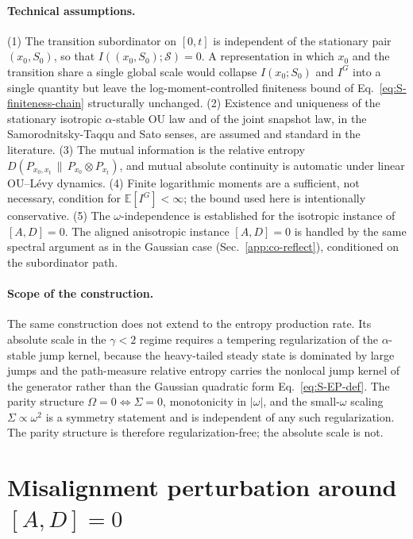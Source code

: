 \documentclass[%
 reprint,
 superscriptaddress,
 nofootinbib,
 nobibnotes,
 amsmath,amssymb,
 aps,
 prl,
 floatfix,
]{revtex4-2}
\newcommand{\E}{\mathbb{E}}
\begin{document}
\paragraph{Technical assumptions.}
(1) The transition subordinator on $[0, t]$ is independent of the stationary pair $(x_0, S_0)$, so that $I((x_0, S_0); \mathcal S) = 0$. A representation in which $x_0$ and the transition share a single global scale would collapse $I(x_0; S_0)$ and $I^G$ into a single quantity but leave the log-moment-controlled finiteness bound of Eq.~\eqref{eq:S-finiteness-chain} structurally unchanged. (2) Existence and uniqueness of the stationary isotropic $\alpha$-stable OU law and of the joint snapshot law, in the Samorodnitsky-Taqqu and Sato senses, are assumed and standard in the literature. (3) The mutual information is the relative entropy $D(P_{x_0, x_t}\,\|\,P_{x_0} \otimes P_{x_t})$, and mutual absolute continuity is automatic under linear OU--L\'evy dynamics. (4) Finite logarithmic moments are a sufficient, not necessary, condition for $\E[I^G] < \infty$; the bound used here is intentionally conservative. (5) The $\omega$-independence is established for the isotropic instance of $[A,D] = 0$. The aligned anisotropic instance $[A,D] = 0$ is handled by the same spectral argument as in the Gaussian case (Sec.~\ref{app:co-reflect}), conditioned on the subordinator path.

\paragraph{Scope of the construction.}
The same construction does not extend to the entropy production rate. Its absolute scale in the $\gamma < 2$ regime requires a tempering regularization of the $\alpha$-stable jump kernel, because the heavy-tailed steady state is dominated by large jumps and the path-measure relative entropy carries the nonlocal jump kernel of the generator rather than the Gaussian quadratic form Eq.~\eqref{eq:S-EP-def}. The parity structure $\Omega = 0 \Leftrightarrow \Sigma = 0$, monotonicity in $|\omega|$, and the small-$\omega$ scaling $\Sigma \propto \omega^2$ is a symmetry statement and is independent of any such regularization. The parity structure is therefore regularization-free; the absolute scale is not.

\section{Misalignment perturbation around $[A,D] = 0$}\label{app:perturb}
\end{document}

